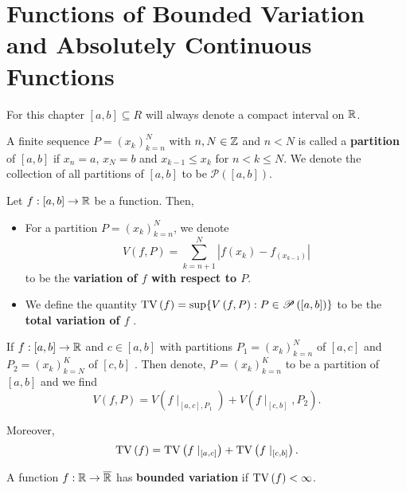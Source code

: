 \section{Functions of Bounded Variation and Absolutely Continuous Functions}
\begin{remark}
	For this chapter \(\left[ a, b \right] \subseteq R\) will always denote a compact interval on \(\mathbb{R}\).
\end{remark}
\begin{definition}[Partition]
	A finite sequence \(P = \left( x_{k} \right)_{k = n}^{N} \) with \(n, N \in \mathbb{Z}\) and \(n < N\) is called a \textbf{partition} of \(\left[ a, b \right] \) if \(x_{n} = a\), \(x_{N} = b\) and \(x_{k-1}\le x_{k}\) for \(n < k \le N\). We denote the collection of all partitions of \(\left[ a, b \right] \) to be \(\mathscr{P}\left( \left[ a, b \right]  \right) \).
\end{definition}
\begin{definition}[]
	Let \(f: \left[ a, b \right]  \to \mathbb{R}\) be a function. Then,
	\begin{itemize}
		\item For a partition \(P = \left( x_{k} \right)_{k=n}^{N} \), we denote \[
			V\left( f, P \right) = \sum_{k= n+1}^{N} \left| f\left( x_{k} \right) - f_\left( x_{k-1} \right)   \right| \] to be the \textbf{variation of \(f\) with respect to \(P\)}.
		\item We define the quantity \(\operatorname{TV} \left( f \right)  = \sup \{ V\left( f, P \right)  : P \in \mathscr{P}\left( \left[ a, b \right]  \right)  \} \) to be the \textbf{total variation of \(f\) }.
	\end{itemize}
\end{definition}
\begin{remark}
	If \(f: \left[ a, b \right]  \to \mathbb{R}\) and \(c\in \left[ a, b \right] \) with partitions \(P_1 = \left( x_{k} \right)_{k=n}^{N} \) of \(\left[ a, c \right] \) and \(P_2 = \left( x_{k} \right)_{k=N}^{K} \) of \(\left[ c, b \right] \) . Then denote, \(P = \left( x_{k} \right)_{k=n}^{K} \) to be a partition of \(\left[ a, b \right] \) and we find \[
		V\left( f, P \right) = V\left( f\mid_{\left[ a, c \right], P_1 } \right)  + V\left( f\mid_{\left[ c, b \right] }, P_2 \right)
	.\]

	Moreover, \[
		\operatorname{TV}\left( f \right) = \operatorname{TV}\left( f\mid_{\left[ a, c \right] }  \right) + \operatorname{TV}\left( f\mid_{\left[ c, b \right] } \right)
	.\]
\end{remark}
\begin{definition}
	A function \(f: \mathbb{R} \to \overline{\mathbb{R}}\) has \textbf{bounded variation} if \(\operatorname{TV}\left( f \right) < \infty\).
\end{definition}
